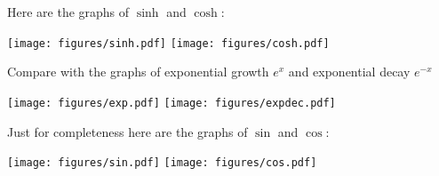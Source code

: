 \documentclass[10pt,aspectratio=169]{beamer}
\begin{document}
\begin{frame}
Here are the graphs of $\sinh$ and $\cosh$:

\begin{center}
\texttt{[image: figures/sinh.pdf]}\quad%
\texttt{[image: figures/cosh.pdf]}
\end{center}

\end{frame}

\begin{frame}
Compare with the graphs of exponential growth $e^x$ and exponential decay
$e^{-x}$

\begin{center}
\texttt{[image: figures/exp.pdf]}\quad%
\texttt{[image: figures/expdec.pdf]}
\end{center}

\end{frame}

\begin{frame}
Just for completeness here are the graphs of $\sin$ and $\cos$:

\begin{center}
\texttt{[image: figures/sin.pdf]}\quad%
\texttt{[image: figures/cos.pdf]}
\end{center}

\end{frame}
\end{document}
